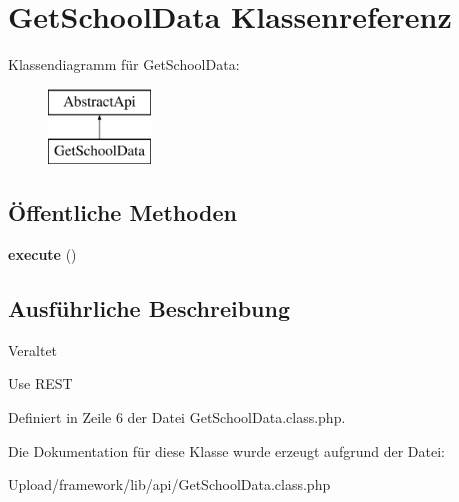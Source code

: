 \hypertarget{class_get_school_data}{}\section{Get\+School\+Data Klassenreferenz}
\label{class_get_school_data}
Klassendiagramm für Get\+School\+Data\+:\begin{figure}[H]
\begin{center}
\leavevmode
\includegraphics[height=2.000000cm]{class_get_school_data}
\end{center}
\end{figure}
\subsection*{Öffentliche Methoden}
\begin{DoxyCompactItemize}
\item 
\mbox{\label{class_get_school_data_a5bfa86450ac203977d4cff150193276e}} 
{\bfseries execute} ()
\end{DoxyCompactItemize}


\subsection{Ausführliche Beschreibung}
\begin{DoxyRefDesc}{Veraltet}
\item[\mbox{\hyperlink{deprecated__deprecated000001}{Veraltet}}]Use R\+E\+ST \end{DoxyRefDesc}


Definiert in Zeile 6 der Datei Get\+School\+Data.\+class.\+php.



Die Dokumentation für diese Klasse wurde erzeugt aufgrund der Datei\+:\begin{DoxyCompactItemize}
\item 
Upload/framework/lib/api/Get\+School\+Data.\+class.\+php\end{DoxyCompactItemize}
